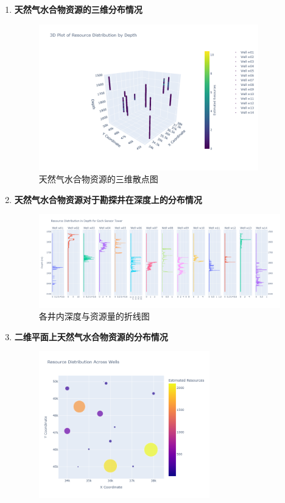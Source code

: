 \documentclass[12pt,a4paper]{nmmcm}
\begin{document}
\begin{enumerate}
  \item \textbf{天然气水合物资源的三维分布情况}\\
        \begin{figure}[H]
          \centering
          \includegraphics[width=0.9\textwidth]{figures/task1/task1-1.png}
          \caption{天然气水合物资源的三维散点图}
        \end{figure}
  \item \textbf{天然气水合物资源对于勘探井在深度上的分布情况}\\
        \begin{figure}[H]
          \centering
          \includegraphics[width=0.99\textwidth]{figures/task1/task1-2.png}
          \caption{各井内深度与资源量的折线图}
        \end{figure}
  \item \textbf{二维平面上天然气水合物资源的分布情况} \\
        \begin{figure}[H]
          \centering
          \includegraphics[width=0.7\textwidth]{figures/task1/task1-3.png}

\end{figure}
\end{enumerate}
\end{document}
